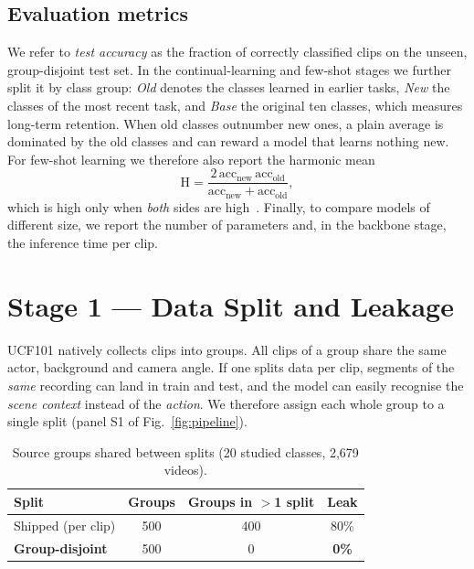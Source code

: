\documentclass[conference]{IEEEtran}
\begin{document}
\subsection{Evaluation metrics}
We refer to \emph{test accuracy} as the fraction of correctly classified clips on the unseen, group-disjoint test set.
In the continual-learning and few-shot stages we further split it by class group: \emph{Old} denotes the classes learned
in earlier tasks, \emph{New} the classes of the most recent task, and \emph{Base} the original ten classes, which measures
long-term retention. When old classes outnumber new ones, a plain average is dominated by the old classes and can reward
a model that learns nothing new. For few-shot learning we therefore also report the harmonic mean
\begin{equation}
\label{eq:harm}
\mathrm{H}=\frac{2\,\mathrm{acc}_{\text{new}}\,\mathrm{acc}_{\text{old}}}
{\mathrm{acc}_{\text{new}}+\mathrm{acc}_{\text{old}}},
\end{equation}
which is high only when \emph{both} sides are high~\cite{tao2020fscil}. Finally, to compare models of different
size, we report the number of parameters and, in the backbone stage, the inference time per clip.

\section{Stage 1 --- Data Split and Leakage}
\label{sec:data}
UCF101 natively collects clips into groups. All clips of a group share the same actor, background and camera angle. If one splits data
per clip, segments of the \emph{same} recording can land in train and test, and the model can easily recognise the \emph{scene context} instead of the \emph{action}. We therefore assign each whole
group to a single split (panel S1 of Fig.~\ref{fig:pipeline}).

\begin{table}[t]
\centering
\caption{Source groups shared between splits (20 studied classes, 2{,}679 videos).}
\label{tab:leak}
\renewcommand{\arraystretch}{1.1}
\begin{tabular}{lccc}
\toprule
Split & Groups & Groups in $>$1 split & Leak \\
\midrule
Shipped (per clip)        & 500 & 400 & 80\% \\
\textbf{Group-disjoint}   & 500 & 0   & \textbf{0\%} \\
\bottomrule
\end{tabular}
\end{table}
\end{document}
